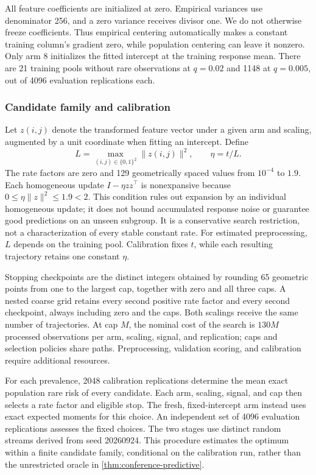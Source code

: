 \documentclass{alt2027}
\begin{document}
All feature coefficients are initialized at zero. Empirical variances use
denominator 256, and a zero variance receives divisor one. We do not otherwise
freeze coefficients. Thus empirical centering automatically makes a constant
training column's gradient zero, while population centering can leave it
nonzero. Only arm 8 initializes the fitted intercept at the training response
mean. There are 21 training pools without rare observations at $q = 0.02$ and
1148 at $q = 0.005$, out of 4096 evaluation replications each.

\subsubsection{Candidate family and calibration}

Let $z(i,j)$ denote the transformed feature vector under a given arm and
scaling, augmented by a unit coordinate when fitting an intercept. Define
\[
  L = \max_{(i,j) \in \{0,1\}^2}\|z(i,j)\|^2, \qquad \eta = t/L.
\]
The rate factors are zero and 129 geometrically spaced values from $10^{-4}$ to
$1.9$. Each homogeneous update $I - \eta zz^\top$ is nonexpansive because
$0 \leq \eta\|z\|^2 \leq 1.9 < 2$. This condition rules out expansion by an
individual homogeneous update; it does not bound accumulated response noise or
guarantee good predictions on an unseen subgroup. It is a conservative search
restriction, not a characterization of every stable constant rate. For estimated
preprocessing, $L$ depends on the training pool. Calibration fixes $t$, while
each resulting trajectory retains one constant $\eta$.

Stopping checkpoints are the distinct integers obtained by rounding 65 geometric
points from one to the largest cap, together with zero and all three caps. A
nested coarse grid retains every second positive rate factor and every second
checkpoint, always including zero and the caps. Both scalings receive the same
number of trajectories. At cap $M$, the nominal cost of the search is $130M$
processed observations per arm, scaling, signal, and replication; caps and
selection policies share paths. Preprocessing, validation scoring, and
calibration require additional resources.

For each prevalence, 2048 calibration replications determine the mean exact
population rare risk of every candidate. Each arm, scaling, signal, and cap then
selects a rate factor and eligible stop. The fresh, fixed-intercept arm instead
uses exact expected moments for this choice. An independent set of 4096
evaluation replications assesses the fixed choices. The two stages use distinct
random streams derived from seed 20260924. This procedure estimates the optimum
within a finite candidate family, conditional on the calibration run, rather
than the unrestricted oracle in \cref{thm:conference-predictive}.
\end{document}
